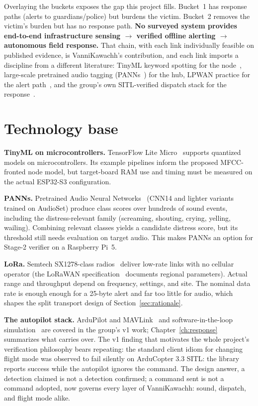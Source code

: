 \documentclass[12pt,a4paper]{report}
\begin{document}
Overlaying the buckets exposes the gap this project fills. Bucket~1
has response paths (alerts to guardians/police) but burdens the
victim. Bucket~2 removes the victim's burden but has no response path.
\textbf{No surveyed system provides end-to-end infrastructure sensing
$\rightarrow$ verified offline alerting $\rightarrow$ autonomous field
response.} That chain, with each link individually feasible on
published evidence, is VanniKawachh's contribution, and each link
imports a discipline from a different literature: TinyML keyword
spotting for
the node~\cite{tflm}, large-scale pretrained audio tagging
(PANNs~\cite{panns}) for the hub, LPWAN practice for the alert
path~\cite{lorawan,sx1278}, and the group's own SITL-verified dispatch
stack for the
response~\cite{ardupilot,dronekit,pymavlink,dronekitsitl}.

\section{Technology base}
\label{sec:techbase}

\textbf{TinyML on microcontrollers.} TensorFlow Lite
Micro~\cite{tflm} supports quantized models on microcontrollers.
Its example pipelines inform the proposed MFCC-fronted node model,
but target-board RAM use and timing must be measured on the actual
ESP32-S3 configuration.

\textbf{PANNs.} Pretrained Audio Neural Networks~\cite{panns} (CNN14
and lighter variants trained on AudioSet) produce class scores
over hundreds of sound events, including the
distress-relevant family (screaming, shouting, crying, yelling,
wailing). Combining relevant classes yields a candidate distress
score, but its threshold still needs evaluation on target audio.
This makes PANNs an option for Stage-2
verifier on a Raspberry Pi~5.

\textbf{LoRa.} Semtech SX1278-class radios~\cite{sx1278} deliver
low-rate links with no cellular operator (the LoRaWAN
specification~\cite{lorawan} documents regional parameters). Actual
range and throughput depend on frequency, settings, and site. The
nominal data rate is enough
enough for a 25-byte alert and far too little for audio, which shapes
the split transport design of Section~\ref{sec:rationale}.

\textbf{The autopilot stack.} ArduPilot and MAVLink~\cite{ardupilot}
and software-in-the-loop simulation~\cite{dronekitsitl} are covered in
the group's v1 work; Chapter~\ref{ch:response} summarizes what carries
over. The v1 finding that motivates the whole project's verification
philosophy bears repeating: the standard client idiom for changing
flight mode was observed to fail silently on ArduCopter 3.3
SITL: the library reports success while the autopilot ignores the
command. The design answer, a detection claimed is not a
detection confirmed; a command sent is not a command adopted, now
governs every layer of VanniKawachh: sound, dispatch, and flight mode
alike.
\end{document}
